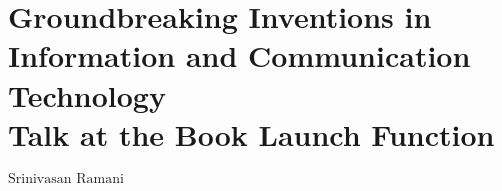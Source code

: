 \chapter{Groundbreaking Inventions in Information and Communication Technology\\ Talk at the Book Launch Function}



\vskip 0.8cm

\begin{center}
{\large\uppercase{$\text{Srinivasan Ramani}$}} 


\vskip -6pt

\end{center}

\vskip 2cm




\vfill




\newpage

